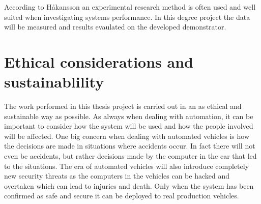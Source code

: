 According to Håkansson \cite{haakansson2013portal} an experimental research method is often used and well suited when investigating systems performance. In this degree project the data will be measured and results evaulated on the developed demonstrator.


\section{Ethical considerations and sustainablility}
The work performed in this thesis project is carried out in an as ethical and sustainable way as possible. As always when dealing with automation, it can be important to consider how the system will be used and how the people involved will be affected. One big concern when dealing with automated vehicles is how the decisions are made in situations where accidents occur. In fact there will not even be accidents, but rather decisions made by the computer in the car that led to the situations. The era of automated vehicles will also introduce completely new security threats as the computers in the vehicles can be hacked and overtaken which can lead to injuries and death. Only when the system has been confirmed as safe and secure it can be deployed to real production vehicles.